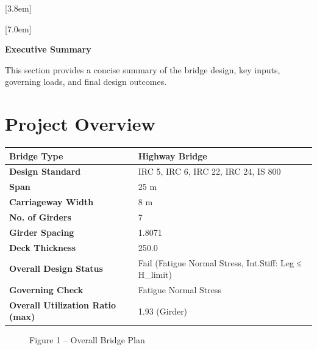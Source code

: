 \documentclass[12pt,a4paper]{report}
\numberwithin{table}{chapter}
\numberwithin{figure}{chapter}
\begin{document}
[3.8em]
  {\normalfont}
  {\contentslabel{2.3em}}
  {\hspace*{-2.3em}}
  {\hfill\contentspage}

[7.0em]
  {\normalfont}
  {\contentslabel{3.2em}}
  {\hspace*{-3.2em}}
  {\hfill\contentspage}

\newpage
\renewcommand{\contentsname}{\centering\Large\bfseries Table of Contents}
\tableofcontents


\newpage
{\centering\Large\bfseries Executive Summary\par}
\vspace{0.8em}

This section provides a concise summary of the bridge design, key inputs, governing loads, and final design outcomes.

\section*{Project Overview}
\label{sec:project-overview}


\begin{tabular}{|L{5.5cm}|L{8.5cm}|}
\hline
\textbf{Bridge Type} & Highway Bridge \\
\hline
\textbf{Design Standard} & IRC 5, IRC 6, IRC 22, IRC 24, IS 800 \\
\hline
\textbf{Span} & 25 m \\
\hline
\textbf{Carriageway Width} & 8 m \\
\hline
\textbf{No. of Girders} & 7 \\
\hline
\textbf{Girder Spacing} & 1.8071 \\
\hline
\textbf{Deck Thickness} & 250.0 \\
\hline
\textbf{Overall Design Status} & Fail (Fatigue Normal Stress, Int.Stiff:\allowbreak{} Leg ≤ H\_\allowbreak{}limit) \\
\hline
\textbf{Governing Check} & Fatigue Normal Stress \\
\hline
\textbf{Overall Utilization Ratio (max)} & 1.93 (Girder) \\
\hline
\end{tabular}


\begin{figure}[H]
\centering
{}
\caption*{Figure 1 -- Overall Bridge Plan}
\end{figure}
\end{document}
